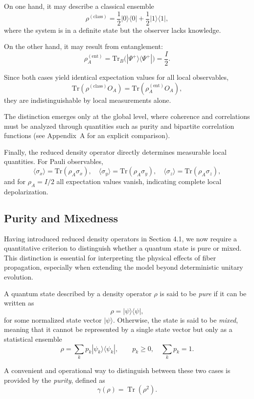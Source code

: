 \documentclass[a4paper]{article}
\begin{document}
On one hand, it may describe a classical ensemble
\[
\rho^{(\mathrm{class})}
=
\frac{1}{2}|0\rangle\langle 0|
+
\frac{1}{2}|1\rangle\langle 1|,
\]
where the system is in a definite state but the observer lacks knowledge.

On the other hand, it may result from entanglement:
\[
\rho_A^{(\mathrm{ent})}
=
\mathrm{Tr}_B\big(|\Psi^+\rangle\langle\Psi^+|\big)
=
\frac{I}{2}.
\]

Since both cases yield identical expectation values for all local observables,
\[
\mathrm{Tr}(\rho^{(\mathrm{class})} O_A)
=
\mathrm{Tr}(\rho_A^{(\mathrm{ent})} O_A),
\]
they are indistinguishable by local measurements alone.

The distinction emerges only at the global level, where coherence and correlations must be analyzed through quantities such as purity and bipartite correlation functions (see Appendix~A for an explicit comparison).

Finally, the reduced density operator directly determines measurable local quantities. For Pauli observables,
\[
\langle \sigma_x \rangle = \mathrm{Tr}(\rho_A \sigma_x), \quad
\langle \sigma_y \rangle = \mathrm{Tr}(\rho_A \sigma_y), \quad
\langle \sigma_z \rangle = \mathrm{Tr}(\rho_A \sigma_z),
\]
and for $\rho_A = I/2$ all expectation values vanish, indicating complete local depolarization.

\subsection{Purity and Mixedness}

Having introduced reduced density operators in Section 4.1, we now require a quantitative criterion to distinguish whether a quantum state is pure or mixed. This distinction is essential for interpreting the physical effects of fiber propagation, especially when extending the model beyond deterministic unitary evolution.

A quantum state described by a density operator $\rho$ is said to be \emph{pure} if it can be written as
\[
\rho = |\psi\rangle \langle \psi|,
\]
for some normalized state vector $|\psi\rangle$. Otherwise, the state is said to be \emph{mixed}, meaning that it cannot be represented by a single state vector but only as a statistical ensemble
\[
\rho = \sum_k p_k |\psi_k\rangle \langle \psi_k|, \qquad p_k \ge 0, \quad \sum_k p_k = 1.
\]

A convenient and operational way to distinguish between these two cases is provided by the \emph{purity}, defined as
\[
\gamma(\rho) = \operatorname{Tr}(\rho^2).
\]
\end{document}
